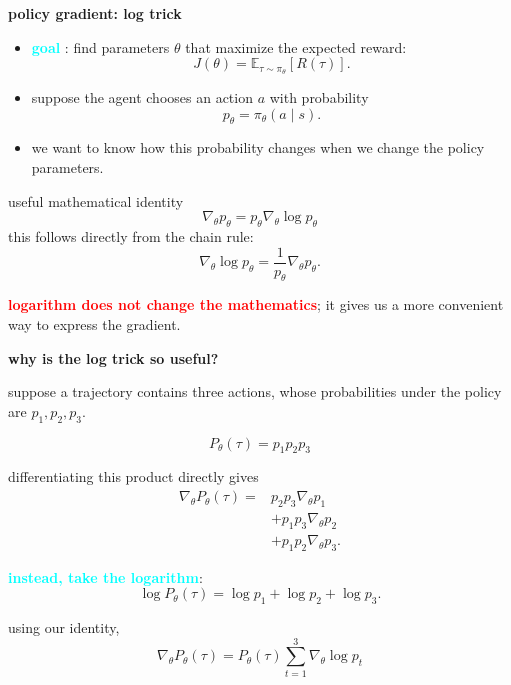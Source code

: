 \documentclass[xcolor=dvipsnames]{beamer}
\begin{document}
\begin{frame}{\bf policy gradient: log trick}

\begin{itemize}
  \item \textbf{\textcolor{cyan}{goal}} : find parameters $\theta$ that maximize
  the expected reward:
  \[
    J(\theta)=\mathbb{E}_{\tau\sim\pi_\theta}[R(\tau)].
  \]

  \item suppose the agent chooses an action $a$ with probability
  \[
    p_\theta=\pi_\theta(a\mid s).
  \]

  \item we want to know how this probability changes when
  we change the policy parameters.
\end{itemize}

\begin{block}{useful mathematical identity}
  \[
    \boxed{
      \nabla_\theta p_\theta
      =p_\theta\nabla_\theta\log p_\theta
    }
  \]
  this follows directly from the chain rule:
  \[
    \nabla_\theta\log p_\theta
    =\frac{1}{p_\theta}\nabla_\theta p_\theta.
  \]
\end{block}

\small
\textbf{\textcolor{red}{logarithm does not change the mathematics}}; it gives us
a more convenient way to express the gradient.

\end{frame}


\begin{frame}{\bf why is the log trick so useful?}

suppose a trajectory contains three actions, whose probabilities
under the policy are $p_1,p_2,p_3$.

\[
  P_\theta(\tau)=p_1p_2p_3
\]

differentiating this product directly gives
\[
\begin{aligned}
\nabla_\theta P_\theta(\tau)
={}&p_2p_3\nabla_\theta p_1\\
 &+p_1p_3\nabla_\theta p_2\\
 &+p_1p_2\nabla_\theta p_3.
\end{aligned}
\]

\textbf{\textcolor{cyan}{instead, take the logarithm}}:
\[
  \log P_\theta(\tau)
  =\log p_1+\log p_2+\log p_3.
\]

using our identity,
\[
  \boxed{
    \nabla_\theta P_\theta(\tau)
    =P_\theta(\tau)
      \sum_{t=1}^{3}\nabla_\theta\log p_t
  }
\]

\end{frame}
\end{document}
